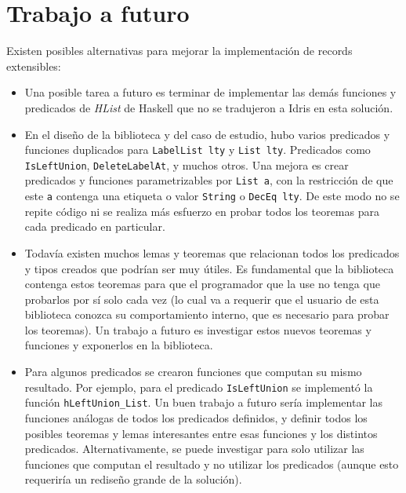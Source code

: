
\chapter{Trabajo a futuro}
\label{ch:6}

Existen posibles alternativas para mejorar la implementación de records extensibles:

\begin{itemize}
\item Una posible tarea a futuro es terminar de implementar las demás funciones y predicados de \textit{HList} de Haskell que no se tradujeron a Idris en esta solución.

\item En el diseño de la biblioteca y del caso de estudio, hubo varios predicados y funciones duplicados para \texttt{LabelList lty} y \texttt{List lty}. Predicados como \texttt{IsLeftUnion}, \texttt{DeleteLabelAt}, y muchos otros. Una mejora es crear predicados y funciones parametrizables por \texttt{List a}, con la restricción de que este \texttt{a} contenga una etiqueta o valor \texttt{String} o \texttt{DecEq lty}. De este modo no se repite código ni se realiza más esfuerzo en probar todos los teoremas para cada predicado en particular.

\item Todavía existen muchos lemas y teoremas que relacionan todos los predicados y tipos creados que podrían ser muy útiles. Es fundamental que la biblioteca contenga estos teoremas para que el programador que la use no tenga que probarlos por sí solo cada vez (lo cual va a requerir que el usuario de esta biblioteca conozca su comportamiento interno, que es necesario para probar los teoremas). Un trabajo a futuro es investigar estos nuevos teoremas y funciones y exponerlos en la biblioteca.

\item Para algunos predicados se crearon funciones que computan su mismo resultado. Por ejemplo, para el predicado \texttt{IsLeftUnion} se implementó la función \texttt{hLeftUnion\_List}. Un buen trabajo a futuro sería implementar las funciones análogas de todos los predicados definidos, y definir todos los posibles teoremas y lemas interesantes entre esas funciones y los distintos predicados. Alternativamente, se puede investigar para solo utilizar las funciones que computan el resultado y no utilizar los predicados (aunque esto requeriría un rediseño grande de la solución).


\end{itemize}
